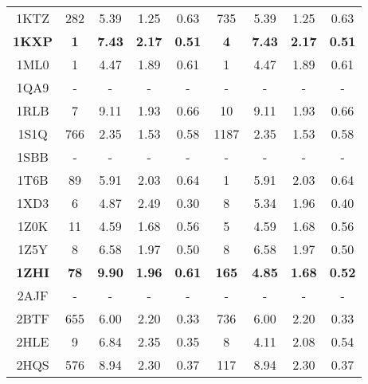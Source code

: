 \begin{longtable}{c c c c c|c c c c}
 {\tiny 1KTZ} &{\tiny 282}&{\tiny 5.39}&{\tiny 1.25}&{\tiny 0.63} &{\tiny 735}&{\tiny 5.39}&{\tiny 1.25}&{\tiny 0.63}\\ 
 \textbf{\tiny 1KXP} &\textbf{\tiny 1}&\textbf{\tiny 7.43}&\textbf{\tiny 2.17}&\textbf{\tiny 0.51} &\textbf{\tiny 4}&\textbf{\tiny 7.43}&\textbf{\tiny 2.17}&\textbf{\tiny 0.51}\\ 
 {\tiny 1ML0} &{\tiny 1}&{\tiny 4.47}&{\tiny 1.89}&{\tiny 0.61} &{\tiny 1}&{\tiny 4.47}&{\tiny 1.89}&{\tiny 0.61}\\ 
 {\tiny 1QA9} &{\tiny -}&{\tiny -}&{\tiny -}&{\tiny -} &{\tiny -}&{\tiny -}&{\tiny -}&{\tiny -}\\ 
 {\tiny 1RLB} &{\tiny 7}&{\tiny 9.11}&{\tiny 1.93}&{\tiny 0.66} &{\tiny 10}&{\tiny 9.11}&{\tiny 1.93}&{\tiny 0.66}\\ 
 {\tiny 1S1Q} &{\tiny 766}&{\tiny 2.35}&{\tiny 1.53}&{\tiny 0.58} &{\tiny 1187}&{\tiny 2.35}&{\tiny 1.53}&{\tiny 0.58}\\ 
 {\tiny 1SBB} &{\tiny -}&{\tiny -}&{\tiny -}&{\tiny -} &{\tiny -}&{\tiny -}&{\tiny -}&{\tiny -}\\ 
 {\tiny 1T6B} &{\tiny 89}&{\tiny 5.91}&{\tiny 2.03}&{\tiny 0.64} &{\tiny 1}&{\tiny 5.91}&{\tiny 2.03}&{\tiny 0.64}\\ 
 {\tiny 1XD3} &{\tiny 6}&{\tiny 4.87}&{\tiny 2.49}&{\tiny 0.30} &{\tiny 8}&{\tiny 5.34}&{\tiny 1.96}&{\tiny 0.40}\\ 
 {\tiny 1Z0K} &{\tiny 11}&{\tiny 4.59}&{\tiny 1.68}&{\tiny 0.56} &{\tiny 5}&{\tiny 4.59}&{\tiny 1.68}&{\tiny 0.56}\\ 
 {\tiny 1Z5Y} &{\tiny 8}&{\tiny 6.58}&{\tiny 1.97}&{\tiny 0.50} &{\tiny 8}&{\tiny 6.58}&{\tiny 1.97}&{\tiny 0.50}\\ 
 \textbf{\tiny 1ZHI} &\textbf{\tiny 78}&\textbf{\tiny 9.90}&\textbf{\tiny 1.96}&\textbf{\tiny 0.61} &\textbf{\tiny 165}&\textbf{\tiny 4.85}&\textbf{\tiny 1.68}&\textbf{\tiny 0.52}\\ 
 {\tiny 2AJF} &{\tiny -}&{\tiny -}&{\tiny -}&{\tiny -} &{\tiny -}&{\tiny -}&{\tiny -}&{\tiny -}\\ 
 {\tiny 2BTF} &{\tiny 655}&{\tiny 6.00}&{\tiny 2.20}&{\tiny 0.33} &{\tiny 736}&{\tiny 6.00}&{\tiny 2.20}&{\tiny 0.33}\\ 
 {\tiny 2HLE} &{\tiny 9}&{\tiny 6.84}&{\tiny 2.35}&{\tiny 0.35} &{\tiny 8}&{\tiny 4.11}&{\tiny 2.08}&{\tiny 0.54}\\ 
 {\tiny 2HQS} &{\tiny 576}&{\tiny 8.94}&{\tiny 2.30}&{\tiny 0.37} &{\tiny 117}&{\tiny 8.94}&{\tiny 2.30}&{\tiny 0.37}\\ 

\end{longtable}
